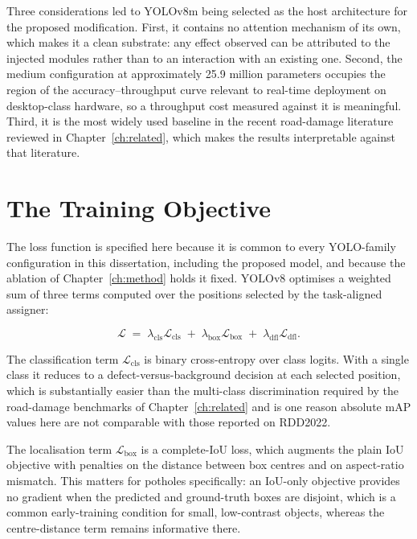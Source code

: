 \documentclass[MScCS]{uccthesis}
\begin{document}
Three considerations led to YOLOv8m being selected as the host architecture for
the proposed modification. First, it contains no attention mechanism of its
own, which makes it a clean substrate: any effect observed can be attributed to
the injected modules rather than to an interaction with an existing one.
Second, the medium configuration at approximately 25.9 million parameters
occupies the region of the accuracy--throughput curve relevant to real-time
deployment on desktop-class hardware, so a throughput cost measured against it
is meaningful. Third, it is the most widely used baseline in the recent
road-damage literature reviewed in Chapter~\ref{ch:related}, which makes the
results interpretable against that literature.

\section{The Training Objective}
\label{sec:loss}

The loss function is specified here because it is common to every YOLO-family
configuration in this dissertation, including the proposed model, and because
the ablation of Chapter~\ref{ch:method} holds it fixed. YOLOv8 optimises a
weighted sum of three terms computed over the positions selected by the
task-aligned assigner:

\begin{equation}
   \mathcal{L} \;=\;
      \lambda_{\mathrm{cls}} \mathcal{L}_{\mathrm{cls}}
      \;+\; \lambda_{\mathrm{box}} \mathcal{L}_{\mathrm{box}}
      \;+\; \lambda_{\mathrm{dfl}} \mathcal{L}_{\mathrm{dfl}} .
   \label{eq:loss}
\end{equation}

The classification term $\mathcal{L}_{\mathrm{cls}}$ is binary cross-entropy
over class logits. With a single class it reduces to a
defect-versus-background decision at each selected position, which is
substantially easier than the multi-class discrimination required by the
road-damage benchmarks of Chapter~\ref{ch:related} and is one reason absolute
mAP values here are not comparable with those reported on RDD2022.

The localisation term $\mathcal{L}_{\mathrm{box}}$ is a complete-IoU loss,
which augments the plain IoU objective with penalties on the distance between
box centres and on aspect-ratio mismatch. This matters for potholes
specifically: an IoU-only objective provides no gradient when the predicted and
ground-truth boxes are disjoint, which is a common early-training condition for
small, low-contrast objects, whereas the centre-distance term remains
informative there.
\end{document}
